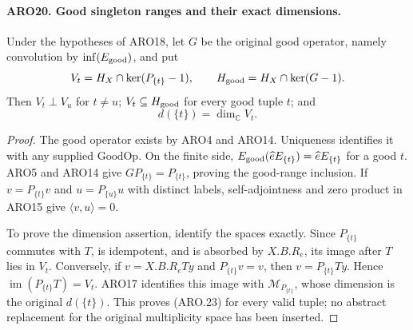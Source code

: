 \paragraph{ARO20. Good singleton ranges and their exact dimensions.}
\label{claim:ARO20}
Under the hypotheses of ARO18, let \(G\) be the original good operator,
namely convolution by
\(\operatorname{inf}(E_{\rm good})\), and put
\[
 V_t=H_X\cap\ker(P_{\{t\}}-1),\qquad
 H_{\rm good}=H_X\cap\ker(G-1).
\]
Then \(V_t\perp V_u\) for \(t\ne u\);
\(V_t\subseteq H_{\rm good}\) for every good tuple \(t\); and
\[
                         d(\{t\})=\dim_{\mathbb C}V_t.
 \tag{ARO.23}
\]
\begin{proof}
The good operator exists by ARO4 and ARO14.  Uniqueness identifies
it with any supplied \(\mathrm{GoodOp}\).  On the finite side,
\(E_{\rm good}(\widehat eE_{\{t\}})=\widehat eE_{\{t\}}\)
for a good \(t\).  ARO5 and ARO14 give
\(GP_{\{t\}}=P_{\{t\}}\), proving the good-range inclusion.
If \(v=P_{\{t\}}v\) and \(u=P_{\{u\}}u\) with distinct labels,
self-adjointness and zero product in ARO15 give \(\langle v,u\rangle=0\).

To prove the dimension assertion, identify the spaces exactly.
Since \(P_{\{t\}}\) commutes with \(T\), is idempotent, and is
absorbed by \(X.B.R_e\), its image after \(T\) lies in \(V_t\).
Conversely, if \(v=X.B.R_eTy\) and \(P_{\{t\}}v=v\), then
\(v=P_{\{t\}}Ty\).  Hence
\(\operatorname{im}(P_{\{t\}}T)=V_t\).
ARO17 identifies this image with \(\mathcal M_{P_{\{t\}}}\),
whose dimension is the original \(d(\{t\})\).  This proves (ARO.23)
for every valid tuple; no abstract replacement for the original
multiplicity space has been inserted.
\end{proof}

